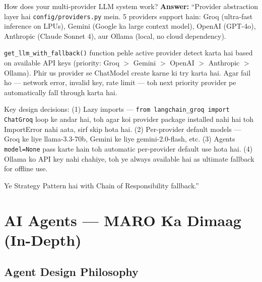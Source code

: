 \documentclass[11pt,a4paper,twoside]{report}
\begin{document}
\begin{interviewbox}{How does your multi-provider LLM system work?}
\textbf{Answer:} ``Provider abstraction layer hai \texttt{config/providers.py} mein. 5 providers support hain: Groq (ultra-fast inference on LPUs), Gemini (Google ka large context model), OpenAI (GPT-4o), Anthropic (Claude Sonnet 4), aur Ollama (local, no cloud dependency).

\texttt{get\_llm\_with\_fallback()} function pehle active provider detect karta hai based on available API keys (priority: Groq $>$ Gemini $>$ OpenAI $>$ Anthropic $>$ Ollama). Phir us provider se ChatModel create karne ki try karta hai. Agar fail ho --- network error, invalid key, rate limit --- toh next priority provider pe automatically fall through karta hai.

Key design decisions: (1) Lazy imports --- \texttt{from langchain\_groq import ChatGroq} loop ke andar hai, toh agar koi provider package installed nahi hai toh ImportError nahi aata, sirf skip hota hai. (2) Per-provider default models --- Groq ke liye llama-3.3-70b, Gemini ke liye gemini-2.0-flash, etc. (3) Agents \texttt{model=None} pass karte hain toh automatic per-provider default use hota hai. (4) Ollama ko API key nahi chahiye, toh ye always available hai as ultimate fallback for offline use.

Ye Strategy Pattern hai with Chain of Responsibility fallback.''
\end{interviewbox}



\chapter{AI Agents --- MARO Ka Dimaag (In-Depth)}

\section{Agent Design Philosophy}
\end{document}
